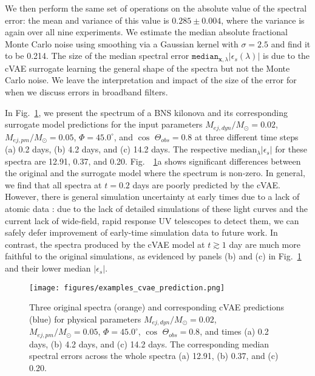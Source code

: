 \documentclass[fleqn,usenatbib,useAMS]{mnras}
\begin{document}
We then perform the same set of operations on the absolute value of the spectral error:
the mean and variance of this value is $0.285 \pm 0.004$, where the variance is again over all nine experiments. 
We estimate the median absolute fractional Monte Carlo noise using smoothing via a Gaussian kernel with $\sigma=2.5$ and find it to be 0.214.
The size of the median spectral error $\texttt{median}_{\mathbf{x}, \lambda} |\epsilon_s(\lambda)|$ is due to the cVAE surrogate learning the general shape of the spectra but not the Monte Carlo noise.
We leave the interpretation and impact of the size of the error for when we discuss errors in broadband filters.

In Fig.~\ref{fig:example_spectra}, we present the spectrum of a BNS kilonova and its corresponding surrogate model predictions for the input parameters $M_{ej, dyn}/M_{\odot} = 0.02$, $M_{ej, pm}/M_{\odot} = 0.05$, $\Phi = 45.0^{\circ}$, and $\cos$ $\Theta_{obs} = 0.8$ at three different time steps (a) 0.2 days, (b) 4.2 days, and (c) 14.2 days. 
The respective $\text{median}_{\lambda}|\epsilon_s|$ for these spectra are 12.91, 0.37, and 0.20.
Fig.~~\ref{fig:example_spectra}a shows significant differences between the original and the surrogate model where the spectrum is non-zero.
In general, we find that all spectra at $t=0.2$ days are poorly predicted by the cVAE.
However, there is general simulation uncertainty at early times due to a lack of atomic data \citep{banerjeeSimulationsEarlyKilonova2020}: due to the lack of detailed simulations of these light curves and the current lack of wide-field, rapid response UV telescopes to detect them, we can safely defer improvement of early-time simulation data to future work.
In contrast, the spectra produced by the cVAE model at $t\gtrsim 1$ day are much more faithful to the original simulations, as evidenced by panels (b) and (c) in Fig.~\ref{fig:example_spectra} and their lower median $|\epsilon_s|$.

\begin{figure}
    \centering
    \texttt{[image: figures/examples\_cvae\_prediction.png]}
    \caption{Three original spectra (orange) and corresponding cVAE predictions (blue) for physical parameters  $M_{ej, dyn}/M_{\odot} = 0.02$, $M_{ej, pm}/M_{\odot} = 0.05$, $\Phi = 45.0^{\circ}$, $\cos$ $\Theta_{obs} = 0.8$, and times (a) 0.2 days, (b) 4.2 days, and (c) 14.2 days. The corresponding median spectral errors across the whole spectra (a) 12.91, (b) 0.37,  and (c) 0.20. 
    }
    \label{fig:example_spectra}
\end{figure}
\end{document}
